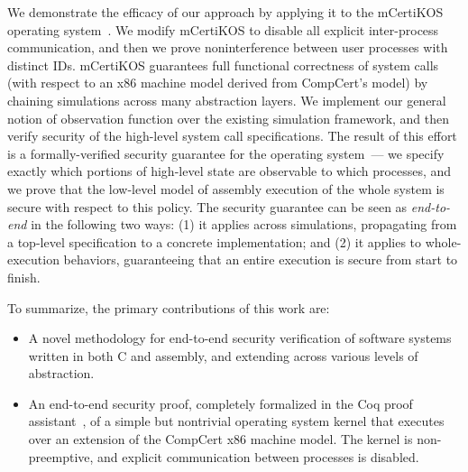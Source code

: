 We demonstrate the efficacy of our approach by applying it to the mCertiKOS 
operating system~\cite{certikos-popl}. We modify mCertiKOS to disable all 
explicit inter-process communication, and then we prove noninterference between 
user processes with distinct IDs. mCertiKOS guarantees full functional correctness 
of system calls (with respect to an x86 machine model derived from
CompCert's model) by chaining simulations across many abstraction layers. We implement
our general notion of observation function over the existing simulation
framework, and then verify security of the high-level system call 
specifications. The result of this effort is a formally-verified security guarantee 
for the operating system~--- we specify exactly which portions of high-level state 
are observable to which processes, and we prove that the low-level 
model of assembly execution of the whole system is secure with respect to this 
policy. The security guarantee can be seen as \emph{end-to-end} in the following two ways:
(1) it applies across simulations, propagating from a top-level specification to a concrete 
implementation; and (2) it applies to whole-execution behaviors, guaranteeing that an 
entire execution is secure from start to finish. 


\vspace{2mm}
\noindent
To summarize, the primary contributions of this work are:
\begin{itemize}
\item A novel methodology for end-to-end security verification of 
software systems written in both C and assembly, and extending across various
levels of abstraction.
\item An end-to-end security proof, completely formalized in the
Coq proof assistant~\cite{coq}, of a simple but nontrivial operating system
kernel that executes over an extension of the CompCert x86 machine model.
The kernel is non-preemptive, and explicit communication between processes 
is disabled.
\end{itemize}

